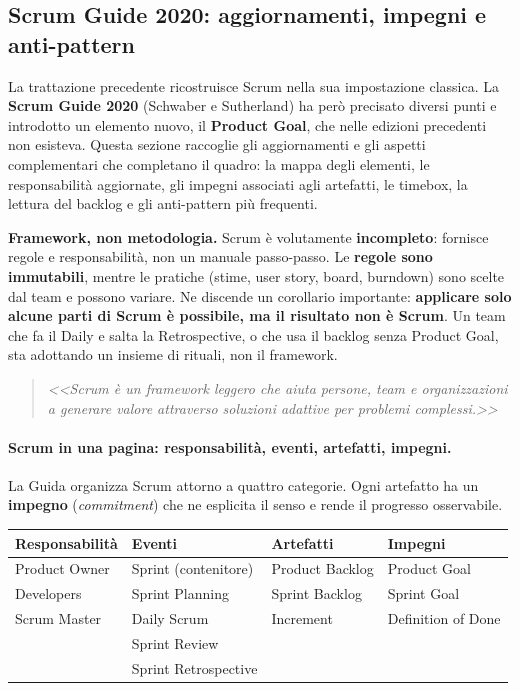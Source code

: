 \documentclass[12pt]{extarticle}
\begin{document}
\subsection{Scrum Guide 2020: aggiornamenti, impegni e anti-pattern}

\noindent La trattazione precedente ricostruisce Scrum nella sua impostazione classica. La \textbf{Scrum Guide 2020} (Schwaber e Sutherland) ha però precisato diversi punti e introdotto un elemento nuovo, il \textbf{Product Goal}, che nelle edizioni precedenti non esisteva. Questa sezione raccoglie gli aggiornamenti e gli aspetti complementari che completano il quadro: la mappa degli elementi, le responsabilità aggiornate, gli impegni associati agli artefatti, le timebox, la lettura del backlog e gli anti-pattern più frequenti.

\noindent \textbf{Framework, non metodologia.} Scrum è volutamente \textbf{incompleto}: fornisce regole e responsabilità, non un manuale passo-passo. Le \textbf{regole sono immutabili}, mentre le pratiche (stime, user story, board, burndown) sono scelte dal team e possono variare. Ne discende un corollario importante: \textbf{applicare solo alcune parti di Scrum è possibile, ma il risultato non è Scrum}. Un team che fa il Daily e salta la Retrospective, o che usa il backlog senza Product Goal, sta adottando un insieme di rituali, non il framework.
\begin{quote}
    \textit{<<Scrum è un framework leggero che aiuta persone, team e organizzazioni a generare valore attraverso soluzioni adattive per problemi complessi.>>}
\end{quote}

\paragraph{Scrum in una pagina: responsabilità, eventi, artefatti, impegni.}
La Guida organizza Scrum attorno a quattro categorie. Ogni artefatto ha un \textbf{impegno} (\textit{commitment}) che ne esplicita il senso e rende il progresso osservabile.

\begin{center}
\small
\begin{tabular}{p{3.2cm}p{4.0cm}p{4.0cm}p{3.4cm}}
    \toprule
    \textbf{Responsabilità} & \textbf{Eventi} & \textbf{Artefatti} & \textbf{Impegni} \\
    \midrule
    Product Owner & Sprint (contenitore) & Product Backlog & Product Goal \\
    \addlinespace
    Developers & Sprint Planning & Sprint Backlog & Sprint Goal \\
    \addlinespace
    Scrum Master & Daily Scrum & Increment & Definition of Done \\
    \addlinespace
     & Sprint Review &  &  \\
    \addlinespace
     & Sprint Retrospective &  &  \\
    \bottomrule
\end{tabular}
\end{center}
\end{document}
